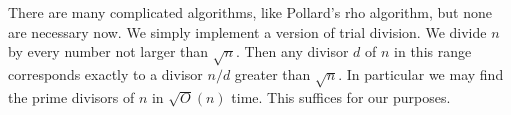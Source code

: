 There are many complicated algorithms, like Pollard's rho algorithm, but none are necessary now. We simply implement a version
of trial division. We divide $n$ by every number not larger than $\sqrt{n}$. Then any divisor $d$ of $n$ in this range corresponds
exactly to a divisor $n/d$ greater than $\sqrt n$. In particular we may find the prime divisors of $n$ in $\sqrt O(n)$ time.
This suffices for our purposes.